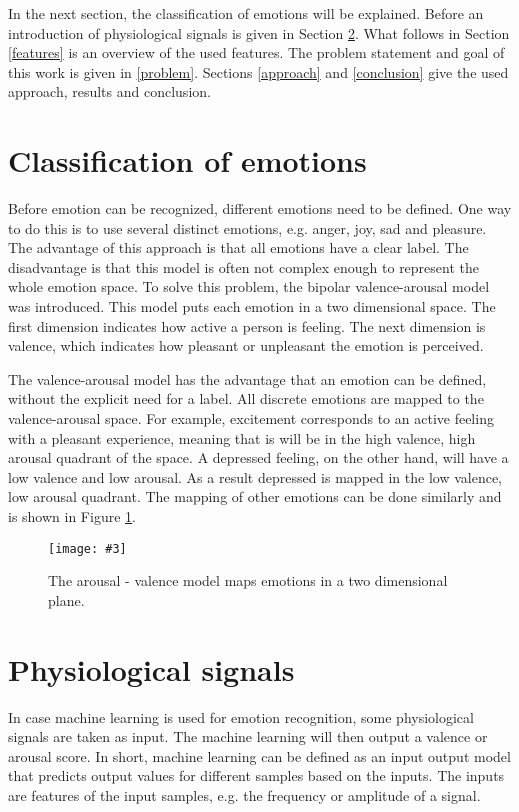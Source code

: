 \documentclass[12pt,journal,compsoc]{IEEEtran}
\newcommand{\npar}{\par \vspace{2.3ex plus 0.3ex minus 0.3ex}}
\newcommand{\mijnfiguur}[4][H]{            %
    \begin{figure}[#1]                      %
        \begin{center}                      %
            \texttt{[image: \#3]}        %
            \caption{#4\label{#3}}          %
        \end{center}
    \end{figure}
    }
\begin{document}
\npar

In the next section, the classification of emotions will be explained. Before an introduction of physiological signals is given in Section \ref{phyintro}. What follows in Section \ref{features} is an overview of the used features. The problem statement and goal of this work is given in \ref{problem}. Sections \ref{approach} and \ref{conclusion} give the used approach, results and conclusion.

\section{Classification of emotions}\label{classification}
Before emotion can be recognized, different emotions need to be defined. One way to do this is to use several distinct emotions, e.g. anger, joy, sad and pleasure. The advantage of this approach is that all emotions have a clear label. The disadvantage is that this model is often not complex enough to represent the whole emotion space. To solve this problem, the bipolar valence-arousal model was introduced\cite{ExtendedPaper,RealTimeEEGEmotion}. This model puts each emotion in a two dimensional space. The first dimension indicates how active a person is feeling. The next dimension is valence, which indicates how pleasant or unpleasant the emotion is perceived. 

\npar

The valence-arousal model has the advantage that an emotion can be defined, without the explicit need for a label. All discrete emotions are mapped to the valence-arousal space. For example, excitement corresponds to an active feeling with a pleasant experience, meaning that is will be in the high valence, high arousal quadrant of the space. A depressed feeling, on the other hand, will have a low valence and low arousal. As a result depressed is mapped in the low valence, low arousal quadrant. The mapping of other emotions can be done similarly and is shown in Figure \ref{ArousalValenceModel}.

\mijnfiguur{width=0.4\textwidth}{ArousalValenceModel}{The arousal - valence model maps emotions in a two dimensional plane.\citep{ValArrFig}}

\section{Physiological signals} \label{phyintro}
In case machine learning is used for emotion recognition, some physiological signals are taken as input. The machine learning will then output a valence or arousal score. In short, machine learning can be defined as an input output model that predicts output values for different samples based on the inputs. The inputs are features of the input samples, e.g. the frequency or amplitude of a signal.
\end{document}
